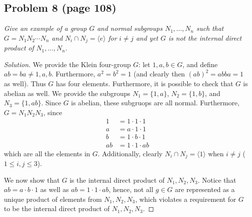 \documentclass{article}
\begin{document}
\subsection*{Problem 8 (page 108)}
{\it Give an example of a group $G$ and normal subgroups $N_1, \dots, N_n$
such that $G = N_1N_2\cdots N_n$ and $N_i \cap N_j = \langle e \rangle$
for $i \neq j$ and yet $G$ is \emph{not} the internal direct product of $N_1,\dots,N_n$.}
\begin{proof}[Solution]\let\qed\relax
	We provide the Klein four-group $G$: let $1,a,b \in G$,
	and define $ab = ba \neq 1,a,b$.
	Furthermore, $a^2 = b^2 = 1$ (and clearly then $(ab)^2 = abba = 1$ as well).
	Thus $G$ has four elements.
	Furthermore, it is possible to check that $G$ is abelian as well.
	We provide the subgroups $N_1 = \{1,a\}$, $N_2 = \{1,b\}$, and $N_3 = \{1,ab\}$.
	Since $G$ is abelian, these subgruops are all normal.
	Furthermore, $G = N_1N_2N_3$, since
	\begin{align*}
		1 &= 1\cdot 1 \cdot 1\\
		a &= a \cdot 1 \cdot 1\\
		b &= 1 \cdot b \cdot 1\\
		ab &= 1 \cdot 1 \cdot ab
	\end{align*}
	which are all the elements in $G$.
	Additionally, clearly $N_i \cap N_j = \langle 1 \rangle$ when $i \neq j$
	($1 \leq i,j \leq 3$).
	
	We now show that $G$ is the internal direct product of $N_1,N_2,N_3$.
	Notice that $ab = a \cdot b \cdot 1$ as well as $ab = 1 \cdot 1 \cdot ab$,
	hence, not all $g \in G$ are represented as a unique product
	of elements from $N_1,N_2,N_3$, which violates a requirement
	for $G$ to be the internal direct product of $N_1,N_2,N_3$.
\end{proof}
\end{document}
